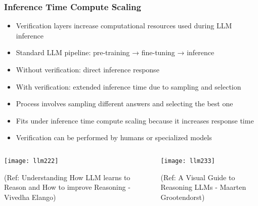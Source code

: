 \begin{frame}[fragile]\frametitle{Inference Time Compute Scaling}
      \begin{itemize}
        \item Verification layers increase computational resources used during LLM inference
        \item Standard LLM pipeline: pre-training → fine-tuning → inference
        \item Without verification: direct inference response
        \item With verification: extended inference time due to sampling and selection
        \item Process involves sampling different answers and selecting the best one
        \item Fits under inference time compute scaling because it increases response time
        \item Verification can be performed by humans or specialized models
      \end{itemize}
	  
	  \begin{columns}
    \begin{column}[T]{0.5\linewidth}
 	  
        \begin{center}
        \texttt{[image: llm222]}
		
		{\tiny (Ref: Understanding How LLM learns to Reason and How to improve Reasoning - Vivedha Elango)}
        \end{center}	

    \end{column}
    \begin{column}[T]{0.5\linewidth}
		\begin{center}
        \texttt{[image: llm233]}
		
		{\tiny (Ref: A Visual Guide to Reasoning LLMs - Maarten Grootendorst)}
		
		\end{center}
    \end{column}
  \end{columns}	  
	  
\end{frame}

